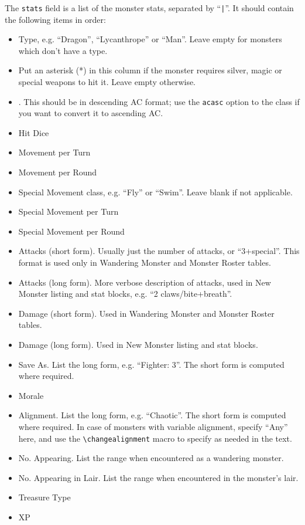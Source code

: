 \documentclass[letterpaper,serif]{module}
\begin{document}
\noindent The \verb|stats| field is a list of the monster stats, separated by ``\verb:|:''. It should contain the following items in order:
\renewcommand{\labelitemi}{$\bullet$}
\begin{itemize}\setlength{\itemsep}{0pt}
\item Type, e.g. ``Dragon'', ``Lycanthrope'' or ``Man''. Leave empty for monsters which don't have a type.
\item Put an asterisk (*) in this column if the monster requires silver, magic or special weapons to hit it. Leave empty otherwise.
\item \ArmourClass. This should be in descending AC format; use the \verb|acasc| option to the class if you want to convert it to ascending AC.
\item Hit Dice
\item Movement per Turn
\item Movement per Round
\item Special Movement class, e.g. ``Fly'' or ``Swim''. Leave blank if not applicable.
\item Special Movement per Turn
\item Special Movement per Round
\item Attacks (short form). Usually just the number of attacks, or ``3+special''. This format is used only in Wandering Monster and Monster Roster tables.
\item Attacks (long form). More verbose description of attacks, used in New Monster listing and stat blocks, e.g. ``2 claws/bite+breath''.
\item Damage (short form). Used in Wandering Monster and Monster Roster tables.
\item Damage (long form). Used in New Monster listing and stat blocks.
\item Save As. List the long form, e.g. ``Fighter: 3''. The short form is computed where required.
\item Morale
\item Alignment. List the long form, e.g. ``Chaotic''. The short form is computed where required. In case of monsters with variable alignment, specify ``Any''
here, and use the \verb|\changealignment| macro to specify as needed in the text.
\item No. Appearing. List the range when encountered as a wandering monster.
\item No. Appearing in Lair. List the range when encountered in the monster's lair.
\item Treasure Type
\item XP
\end{itemize}
\end{document}

